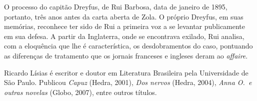 \begin{resumopage}
\item[O processo do capitão Dreyfus,] de Rui Barbosa, data de janeiro de 1895,
portanto, três anos antes da carta aberta de Zola. O próprio Dreyfus, em suas
memórias, reconhece ter sido de Rui a primeira voz a se levantar publicamente
em sua defesa. A partir da Inglaterra, onde se encontrava exilado, Rui analisa,
com a eloquência que lhe é característica, os desdobramentos do caso, pontuando
as diferenças de tratamento que os jornais franceses e ingleses deram ao
\textit{affaire}.

\item[Ricardo Lísias] é escritor e doutor em Literatura Brasileira pela
Universidade de São Paulo. Publicou \textit{Capuz} (Hedra, 2001), \textit{Dos
nervos} (Hedra, 2004),  \textit{Anna O.~e outras novelas} (Globo, 2007), entre
outros títulos.

\end{resumopage}

